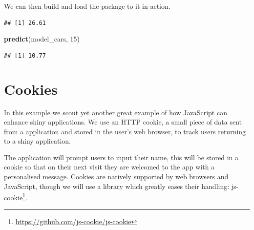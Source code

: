 \documentclass[
]{krantz}
\makeatletter
\newenvironment{Shaded}{\begin{snugshade}}{\end{snugshade}}
\newcommand{\CommentTok}[1]{\textcolor[rgb]{0.37,0.37,0.37}{\textit{#1}}}
\newcommand{\DecValTok}[1]{\textcolor[rgb]{0.06,0.06,0.06}{#1}}
\newcommand{\KeywordTok}[1]{\textcolor[rgb]{0.27,0.27,0.27}{\textbf{#1}}}
\newcommand{\NormalTok}[1]{#1}
\newcommand{\OperatorTok}[1]{\textcolor[rgb]{0.43,0.43,0.43}{\textbf{#1}}}
\newcommand{\StringTok}[1]{\textcolor[rgb]{0.5,0.5,0.5}{#1}}
\renewcommand{\href}[2]{#2\footnote{\url{#1}}}
\newenvironment{kframe}{%
\medskip{}
\setlength{\fboxsep}{.8em}
 \def\at@end@of@kframe{}%
 \ifinner\ifhmode%
  \def\at@end@of@kframe{\end{minipage}}%
  \begin{minipage}{\columnwidth}%
 \fi\fi%
 \def\FrameCommand##1{\hskip\@totalleftmargin \hskip-\fboxsep
 \colorbox{shadecolor}{##1}\hskip-\fboxsep
     \hskip-\linewidth \hskip-\@totalleftmargin \hskip\columnwidth}%
 \MakeFramed {\advance\hsize-\width
   \@totalleftmargin\z@ \linewidth\hsize
   \@setminipage}}%
 {\par\unskip\endMakeFramed%
 \at@end@of@kframe}
\renewenvironment{Shaded}{\begin{kframe}}{\end{kframe}}
\makeatother
\begin{document}
We can then build and load the package to it in action.

\begin{Shaded}
\end{Shaded}

\begin{verbatim}
## [1] 26.61
\end{verbatim}

\begin{Shaded}
\begin{Highlighting}[]
\KeywordTok{predict}\NormalTok{(model\_cars, }\DecValTok{15}\NormalTok{)}
\end{Highlighting}
\end{Shaded}

\begin{verbatim}
## [1] 10.77
\end{verbatim}

\hypertarget{cookies}{%
\chapter{Cookies}\label{cookies}}

In this example we scout yet another great example of how JavaScript can enhance shiny applications. We use an HTTP cookie, a small piece of data sent from a application and stored in the user's web browser, to track users returning to a shiny application.

The application will prompt users to input their name, this will be stored in a cookie so that on their next visit they are welcomed to the app with a personalised message. Cookies are natively supported by web browsers and JavaScript, though we will use a library which greatly eases their handling: \href{https://github.com/js-cookie/js-cookie}{js-cookie}.
\end{document}
